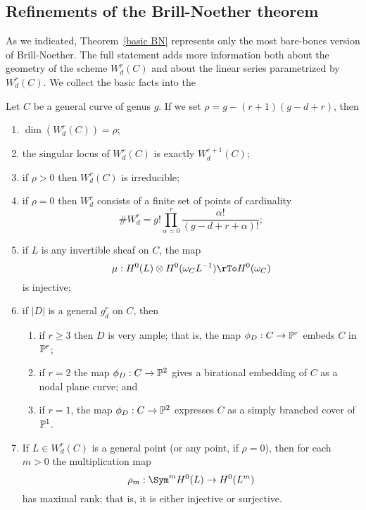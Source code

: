 \subsection{Refinements of the Brill-Noether theorem}

As we indicated, Theorem~\ref{basic BN} represents only the most bare-bones version of Brill-Noether. The full statement  adds more information both about the geometry of the scheme $W^r_d(C)$ and about the linear series parametrized by $W^r_d(C)$.  We collect the basic facts into the 

\begin{theorem}\label{BN omnibus}
Let $C$ be a general curve of genus $g$. If we set $\rho = g - (r+1)(g-d+r)$, then
\begin{enumerate}
\item $\dim(W^r_d(C)) = \rho$;
\item\label{sing wrd} the singular locus of $W^r_d(C)$ is exactly $W^{r+1}_d(C)$;
\item\label{irr wrd} if $\rho > 0$ then $W^r_d(C)$ is irreducible;
\item\label{rho=0} if $\rho = 0$ then $W^r_d$ consists of a finite set of  points of cardinality
$$
\#W^r_d = g! \prod_{\alpha=0}^r \frac{\alpha!}{(g-d+r+\alpha)!};
$$
\item\label{Petri} if $L$ is any invertible sheaf on $C$, the map
$$
\mu : H^0(L) \otimes H^0(\omega_CL^{-1}) \rTo H^0(\omega_C)
$$
is injective;
\item\label{general va} if $|D|$ is a general $g^r_d$ on $C$, then
\begin{enumerate}
\item if $r \geq 3$ then $D$ is very ample; that is, the map $\phi_D : C \to \PP^r$   embeds $C$ in $\PP^r$;
\item if $r=2$ the map $\phi_D : C \to \PP^2$ gives a birational embedding of $C$ as a nodal plane curve; and 
\item if $r=1$, the map $\phi_D : C \to \PP^2$ expresses $C$ as a simply branched cover of $\PP^1$.
\end{enumerate}

\item\label{maximal rank} If $L \in W^r_d(C)$ is a general point (or any point, if $\rho = 0$), then for each $m > 0$ the multiplication map
$$
\rho_m : \Sym^m H^0(L) \to H^0(L^m)
$$
has maximal rank; that is, it is either injective or surjective.
\end{enumerate}
\end{theorem}

